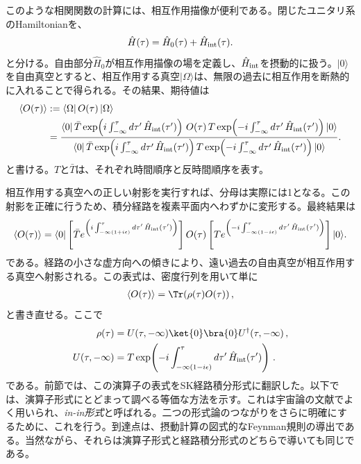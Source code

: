 \documentclass[a4paper,11pt,oneside]{article}
\theoremstyle{definition}
\numberwithin{equation}{section}
\newcommand{\ex}[1]{\langle #1 \rangle}
\begin{document}
このような相関関数の計算には、相互作用描像が便利である。閉じたユニタリ系のHamiltonianを、
\begin{equation}
\hat H(\tau)=\hat H_0(\tau)+\hat H_{\rm int}(\tau) .
\end{equation}
と分ける。自由部分\(\hat H_0\)が相互作用描像の場を定義し、\(\hat H_{\rm int}\)を摂動的に扱う。\(|0\rangle\)を自由真空とすると、相互作用する真空\(|\Omega\rangle\)は、無限の過去に相互作用を断熱的に入れることで得られる。その結果、期待値は
\begin{align}
\langle O(\tau)\rangle
&:=
\langle \Omega |\, O(\tau)\, | \Omega \rangle \\ \nonumber
&=
\frac{
\langle 0|\, \bar T \exp\!\left(i\int_{-\infty}^{\tau} d\tau' \,\hat H_{\rm int}(\tau')\right)
\, O(\tau)\,
T \exp\!\left(-i\int_{-\infty}^{\tau} d\tau' \,\hat H_{\rm int}(\tau')\right)
|0\rangle
}{
\langle 0|\, \bar T \exp\!\left(i\int_{-\infty}^{\tau} d\tau' \,\hat H_{\rm int}(\tau')\right)
T \exp\!\left(-i\int_{-\infty}^{\tau} d\tau' \,\hat H_{\rm int}(\tau')\right)
|0\rangle
} .
\end{align}
と書ける。\(T\)と\(\bar T\)は、それぞれ時間順序と反時間順序を表す。



相互作用する真空への正しい射影を実行すれば、分母は実際には1となる。この射影を正確に行うため、積分経路を複素平面内へわずかに変形する。最終結果は
\begin{equation}\label{inin-factorized}
\langle O(\tau)\rangle
=
\langle 0|
\left[
\bar T e^{\left(i\int_{-\infty(1+i\epsilon)}^{\tau} d\tau' \,\hat H_{\rm int}(\tau')\right)
}\right]
O(\tau)
\left[
T e^{ \left(-i\int_{-\infty(1-i\epsilon)}^{\tau} d\tau' \,\hat H_{\rm int}(\tau')\right)
}\right]
|0\rangle .
\end{equation}
である。経路の小さな虚方向への傾きにより、遠い過去の自由真空が相互作用する真空へ射影される。この表式は、密度行列を用いて単に
\begin{align}
\ex{O(\tau)}=\Tr(\rho(\tau) O(\tau))\,,
\end{align}
と書き直せる。ここで
\begin{align}
\rho(\tau)&=U(\tau,-\infty)\ket{0}\bra{0}U^{\dagger}(\tau,-\infty)\,,\\
U(\tau,-\infty)&=T \exp\!\left(-i\int_{-\infty(1-i\epsilon)}^{\tau} d\tau' \,\hat H_{\rm int}(\tau')\right)\,.
\end{align}
である。前節では、この演算子の表式をSK経路積分形式に翻訳した。以下では、演算子形式にとどまって調べる等価な方法を示す。これは宇宙論の文献でよく用いられ、\textit{in-in形式}と呼ばれる。二つの形式論のつながりをさらに明確にするために、これを行う。到達点は、摂動計算の図式的なFeynman規則の導出である。当然ながら、それらは演算子形式と経路積分形式のどちらで導いても同じである。\\
\end{document}
